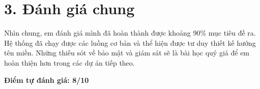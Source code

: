 \documentclass[12pt,a4paper]{report}
\begin{document}
\section*{3. Đánh giá chung}
Nhìn chung, em đánh giá mình đã hoàn thành được khoảng 90\% mục tiêu đề ra. Hệ thống đã chạy được các luồng cơ bản và thể hiện được tư duy thiết kế hướng tên miền. Những thiếu sót về bảo mật và giám sát sẽ là bài học quý giá để em hoàn thiện hơn trong các dự án tiếp theo.

\textbf{Điểm tự đánh giá: 8/10}
\end{document}
